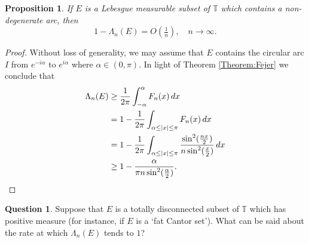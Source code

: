 \documentclass[11pt,reqno]{amsart}
\numberwithin{equation}{section}
\theoremstyle{plain}
\newtheorem{Proposition}[equation]{Proposition}
\theoremstyle{definition}
\newtheorem{Question}[equation]{Question}
\begin{document}
	\begin{Proposition}
		If $E$ is a Lebesgue measurable subset of ${\mathbb{T}}$ which contains a non-degenerate arc, then
		\begin{equation*}
			1 - \Lambda_n(E) = O(\tfrac{1}{n}), \quad n \to \infty.
		\end{equation*}
	\end{Proposition}
	
	\begin{proof}
		Without loss of generality, we may assume that $E$ contains the circular arc
		$I$ from $e^{-i\alpha}$ to $e^{i\alpha}$ where $\alpha \in (0, \pi)$.
		In light of Theorem \ref{Theorem:Fejer} we conclude that
		\begin{align*}
			\Lambda_n(E)
			&\geq \frac{1}{2\pi} \int_{-\alpha}^{\alpha}F_n(x)\,dx \\
			&= 1 - \frac{1}{2\pi} \int_{\alpha \leq |x| \leq \pi}F_n(x)\,dx \\
			&= 1 - \frac{1}{2\pi} \int_{\alpha \leq |x| \leq \pi} \frac{ \sin^2( \frac{nx}{2})}{n \sin^2(\frac{x}{2})}\,dx \\
			&\geq 1 - \frac{\alpha}{\pi n \sin^2 (\frac{\alpha}{2})}.\qedhere
		\end{align*}
	\end{proof}

	\begin{Question}
		Suppose that $E$ is a totally disconnected subset of ${\mathbb{T}}$ which has positive measure
		(for instance, if $E$ is a `fat Cantor set').  What can be said about the rate at which $\Lambda_n(E)$ tends to $1$?
	\end{Question}
\end{document}
